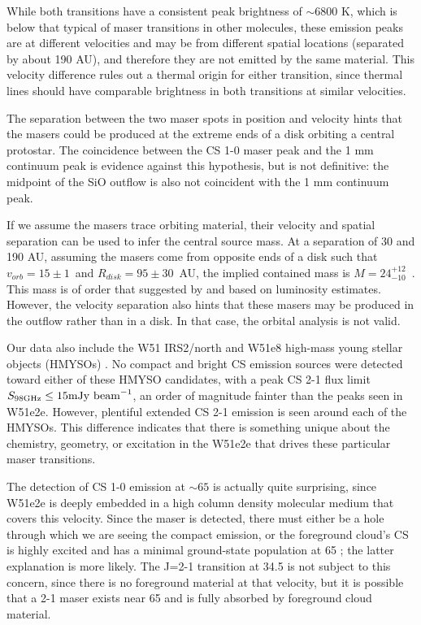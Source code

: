 \documentclass[twocolumn]{aastex62}
\begin{document}
While both transitions have a consistent peak brightness of $\sim6800$ K,
which is below that typical of maser transitions in other molecules, these
emission peaks are at different velocities and may be from different spatial
locations (separated
by about 190 AU), and therefore they are not emitted by the same material.
This velocity difference rules out a thermal origin for either transition,
since thermal lines should have comparable brightness in both transitions
at similar velocities.

The separation between the two maser spots in position and velocity hints
that the masers could be produced at the extreme ends of a disk orbiting
a central protostar.  The coincidence between the CS 1-0 maser peak and
the 1 mm continuum peak is evidence against this hypothesis, but is not definitive:
the midpoint of the SiO outflow is also not coincident with the 1 mm continuum
peak.

If we assume the masers trace orbiting material, their velocity and spatial
separation can be used to infer the central source mass.  At a separation of 30
\kms and 190 AU, assuming the masers come from opposite ends of a disk such
that $v_{orb}=15\pm1$~\kms and $R_{disk}=95\pm30$~AU, the implied contained mass is
$M=24_{-10}^{+12}$~\msun.  This mass is of order that suggested by
\citet{Ginsburg2017a} and \citet{Goddi2018a} based on luminosity estimates.
However, the velocity separation also hints that these masers may be produced
in the outflow rather than in a disk.  In that case, the orbital analysis
is not valid.


Our data also include the W51 IRS2/north and W51e8 high-mass young stellar
objects (HMYSOs) \citep{Ginsburg2017a}.  No compact and bright CS emission
sources were detected
toward either of these HMYSO candidates, with a peak CS 2-1 flux limit ${S_{98
\mathrm{GHz}} \leq 15 \mathrm{mJy~\textrm{beam}^{-1}}}$, an order of magnitude fainter
than the peaks seen in W51e2e.  However, plentiful extended CS 2-1 emission is
seen around each of the HMYSOs.  This difference indicates that there is
something unique about the chemistry, geometry, or excitation in the W51e2e
that drives these particular maser transitions.

The detection of CS 1-0 emission at $\sim65$ \kms is actually quite surprising,
since W51e2e is deeply embedded in a high column density molecular medium that
covers this velocity.  Since the maser is detected, there must either be a hole
through which we are seeing the compact emission, or the foreground cloud's CS
is highly excited and has a minimal ground-state population at 65 \kms; the
latter explanation is more likely.  The J=2-1 transition at 34.5 \kms is not
subject to this concern, since there is no foreground material at that
velocity, but it is possible that a 2-1 maser exists near 65 \kms and is fully
absorbed by foreground cloud material.
\end{document}
